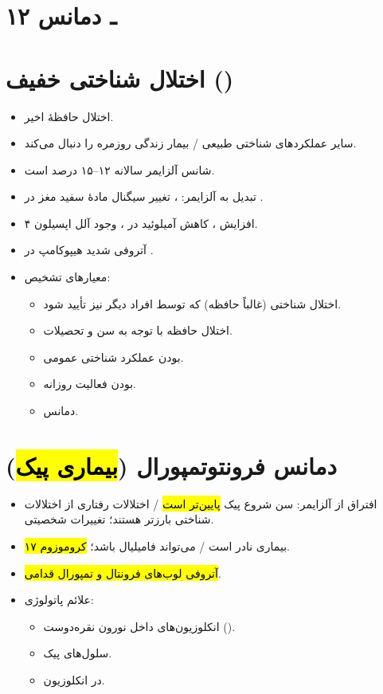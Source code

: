 \section*{۱۲ ـ دمانس}
\section{اختلال شناختی خفیف ()}
\begin{itemize}
\item اختلال حافظهٔ اخیر.
\item سایر عملکردهای شناختی طبیعی / بیمار زندگی روزمره را دنبال می‌کند.
\item شانس آلزایمر سالانه ۱۲–۱۵ درصد است.
\item {} تبدیل به آلزایمر: ، تغییر سیگنال مادهٔ سفید مغز در .
\item افزایش ، کاهش آمیلوئید  در ، وجود آلل اپسیلون ۴.
\item آتروفی شدید هیپوکامپ در .
\item معیارهای تشخیص:
\begin{itemize}
\item اختلال شناختی (غالباً حافظه) که توسط افراد دیگر نیز تأیید شود.
\item اختلال حافظه با توجه به سن و تحصیلات.
\item {} بودن عملکرد شناختی عمومی.
\item {} بودن فعالیت روزانه.
\item {} دمانس.
\end{itemize}
\end{itemize}
\section{دمانس فرونتوتمپورال (\hl{بیماری پیک})}
\begin{itemize}
\item افتراق از آلزایمر: سن شروع پیک \hl{پایین‌تر است} / اختلالات رفتاری از اختلالات شناختی بارزتر هستند؛ تغییرات شخصیتی.
\item بیماری نادر است / می‌تواند فامیلیال باشد؛ \hl{کروموزوم ۱۷}.
\item \hl{آتروفی لوب‌های فرونتال و تمپورال قدامی}.
\item علائم پاتولوژی:
\begin{itemize}
\item انکلوزیون‌های داخل نورون نقره‌دوست (\hl{}).
\item سلول‌های پیک.
\item {} در انکلوزیون.
\end{itemize}
\end{itemize}

